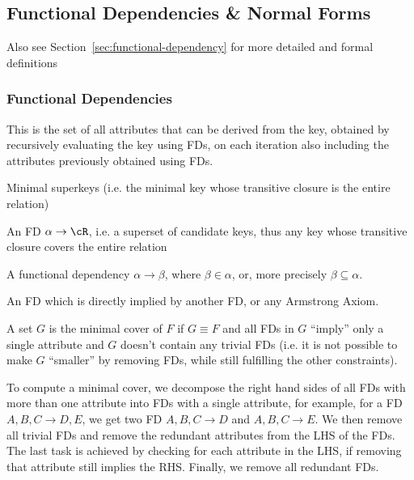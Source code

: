 \subsection{Functional Dependencies \& Normal Forms}
Also see Section~\ref{sec:functional-dependency} for more detailed and formal definitions

\subsubsection{Functional Dependencies}
 This is the set of all attributes that can be derived from the key, obtained by recursively evaluating the key using FDs,
on each iteration also including the attributes previously obtained using FDs.

 Minimal superkeys (i.e. the minimal key whose transitive closure is the entire relation)

\inlinedefinition[Superkey] An FD $\alpha \rightarrow \cR$, i.e. a superset of candidate keys, thus any key whose transitive closure covers the entire relation

\inlinedefinition[Trivial FD] A functional dependency $\alpha \rightarrow \beta$, where $\beta \in \alpha$, or, more precisely $\beta \subseteq \alpha$.

\inlinedefinition[Redundant FD] An FD which is directly implied by another FD, or any Armstrong Axiom.

 A set $G$ is the minimal cover of $F$ if $G \equiv F$ and all FDs in $G$ ``imply'' only a single attribute
and $G$ doesn't contain any trivial FDs (i.e. it is not possible to make $G$ ``smaller'' by removing FDs, while still fulfilling the other constraints).

To compute a minimal cover, we decompose the right hand sides of all FDs with more than one attribute into FDs with a single attribute,
for example, for a FD $A, B, C \rightarrow D, E$, we get two FD $A, B, C \rightarrow D$ and $A, B, C \rightarrow E$.
We then remove all trivial FDs and remove the redundant attributes from the LHS of the FDs.
The last task is achieved by checking for each attribute in the LHS, if removing that attribute still implies the RHS.
Finally, we remove all redundant FDs.


